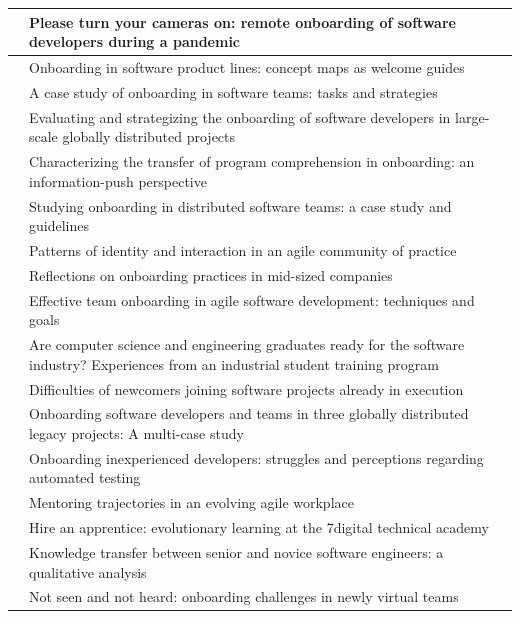 \documentclass[utf8]{gradu3}
\begin{document}
\begin{footnotesize}
\begin{longtable}{ m{4cm}  m{10.5cm} }
\textcite{rodeghero-ym-2021} & Please turn your cameras on: remote onboarding of software developers during a pandemic \\
\hline
\textcite{azanza-ym-2021} & Onboarding in software product lines: concept maps as welcome guides \\
\hline
\textcite{ju-ym-2021} & A case study of onboarding in software teams: tasks and strategies \\
\hline
\textcite{britto-ym-2020} & Evaluating and strategizing the onboarding of software developers in large-scale globally distributed projects\\
\hline
\textcite{yates-ym-2020} & Characterizing the transfer of program comprehension in onboarding: an information-push perspective\\
\hline
\textcite{moe-ym-2020} & Studying onboarding in distributed software teams: a case study and guidelines \\
\hline
\textcite{kumar-wallace-2019} & Patterns of identity and interaction in an agile community of practice \\
\hline
\textcite{viviani-murphy-2019} & Reflections on onboarding practices in mid-sized companies \\
\hline
\textcite{buchan-ym-2019} & Effective team onboarding in agile software development: techniques and goals \\
\hline
\textcite{tuzun-ym-2018} & Are computer science and engineering graduates ready for the software industry? Experiences from an industrial student training program \\
\hline
\textcite{matturro-ym-2017} & Difficulties of newcomers joining software projects already in execution \\
\hline
\textcite{britto-ym-2017} & Onboarding software developers and teams in three globally distributed legacy projects: A multi-case study \\
\hline
\textcite{pham-ym-2017} & Onboarding inexperienced developers: struggles and perceptions regarding automated testing \\
\hline
\textcite{kumar-ym-2016} & Mentoring trajectories in an evolving agile workplace \\
\hline
\textcite{shannon-pool-2016} & Hire an apprentice: evolutionary learning at the 7digital technical academy \\
\hline
\textcite{viana-ym-2014} & Knowledge transfer between senior and novice software engineers: a qualitative analysis \\
\hline
\textcite{hemphill-begel-2011} & Not seen and not heard: onboarding challenges in newly virtual teams \\

\end{longtable}
\end{footnotesize}
\end{document}
